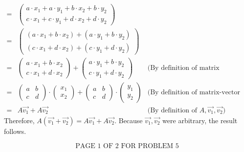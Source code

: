 \documentclass[12pt]{article}
\newenvironment{problem}[2][Problem]
{
	\begin{trivlist} 
		\item[\hskip \labelsep {\bfseries #1 #2:}]
	}
{
	\end{trivlist}
	}
\newenvironment{solution}[1][Solution]
{
	\begin{trivlist} 
		\item[\hskip \labelsep {\itshape #1:}]
	}
	{
	\end{trivlist}
}
\begin{document}
\begin{problem}{5}
\begin{solution}
\begin{align*}
=& \begin{pmatrix} a\cdot x_{1}+ a\cdot y_{1}+ b\cdot x_{2}+b\cdot  y_{2}\\c\cdot x_{1}+ c\cdot y_{1}+d\cdot x_{2}+ d\cdot y_{2} \end{pmatrix} &\\
=& \begin{pmatrix} (a\cdot x_{1}+ b\cdot x_{2})+ (a\cdot y_{1}+b\cdot  y_{2})\\ (c\cdot x_{1}+ d\cdot x_{2})+(c\cdot y_{1}+ d\cdot y_{2}) \end{pmatrix} &\\
=& \begin{pmatrix} a\cdot x_{1}+ b\cdot x_{2}\\ c\cdot x_{1}+ d\cdot x_{2} \end{pmatrix} + \begin{pmatrix}  a\cdot y_{1}+b\cdot  y_{2}\\ c\cdot y_{1}+ d\cdot y_{2} \end{pmatrix} & \text{(By definition of matrix addition)}\\
=&\begin{pmatrix} a&b\\c&d\end{pmatrix} \cdot \begin{pmatrix}x_{1}\\x_{2}\end{pmatrix} +\begin{pmatrix} a&b\\c&d\end{pmatrix} \cdot \begin{pmatrix}y_{1}\\y_{2}\end{pmatrix} & \text{(By definition of matrix-vector product)}\\
=& A \vec{v_{1}}+ A \vec{v_{2}} &\text{(By definition of $A, \vec{v_{1}},\vec{v_{2}}$)}
\end{align*}
Therefore, $A(\vec{v_{1}}+\vec{v_{2}})=A\vec{v_{1}}+A\vec{v_{2}}$. Because $\vec{v_{1}},\vec{v_{2}}$ were arbitrary, the result follows.
\end{solution}
\noindent
\newline
\newline
\newline
\newline
\newline
\newline
\newline
\newline
\newline
\newline
\[
\text{PAGE 1 OF 2 FOR PROBLEM 5}
\]
\end{problem}
\end{document}
